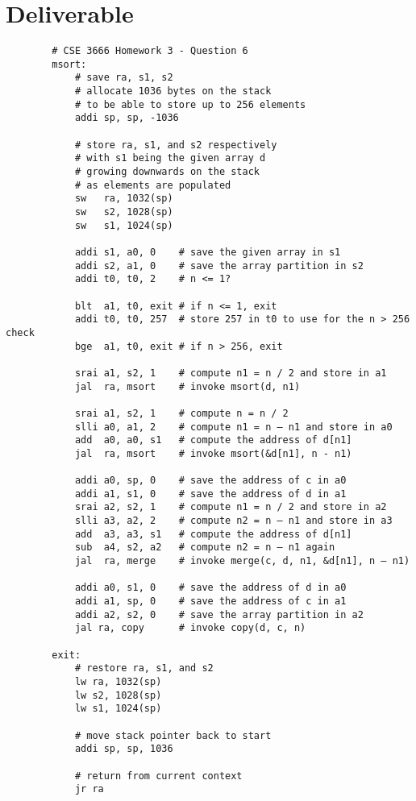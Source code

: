 \documentclass{article}
\begin{document}
\section{Deliverable}
    \begin{lstlisting}
        # CSE 3666 Homework 3 - Question 6
        msort:
            # save ra, s1, s2
            # allocate 1036 bytes on the stack
            # to be able to store up to 256 elements
            addi sp, sp, -1036

            # store ra, s1, and s2 respectively
            # with s1 being the given array d
            # growing downwards on the stack
            # as elements are populated
            sw   ra, 1032(sp)
            sw   s2, 1028(sp)
            sw   s1, 1024(sp) 

            addi s1, a0, 0    # save the given array in s1
            addi s2, a1, 0    # save the array partition in s2
            addi t0, t0, 2    # n <= 1?

            blt  a1, t0, exit # if n <= 1, exit
            addi t0, t0, 257  # store 257 in t0 to use for the n > 256 check
            bge  a1, t0, exit # if n > 256, exit

            srai a1, s2, 1    # compute n1 = n / 2 and store in a1
            jal  ra, msort    # invoke msort(d, n1)

            srai a1, s2, 1    # compute n = n / 2
            slli a0, a1, 2    # compute n1 = n – n1 and store in a0
            add  a0, a0, s1   # compute the address of d[n1]
            jal  ra, msort    # invoke msort(&d[n1], n - n1)
            
            addi a0, sp, 0    # save the address of c in a0
            addi a1, s1, 0    # save the address of d in a1
            srai a2, s2, 1    # compute n1 = n / 2 and store in a2
            slli a3, a2, 2    # compute n2 = n – n1 and store in a3
            add  a3, a3, s1   # compute the address of d[n1]
            sub  a4, s2, a2   # compute n2 = n – n1 again
            jal  ra, merge    # invoke merge(c, d, n1, &d[n1], n – n1)
            
            addi a0, s1, 0    # save the address of d in a0
            addi a1, sp, 0    # save the address of c in a1
            addi a2, s2, 0    # save the array partition in a2
            jal ra, copy      # invoke copy(d, c, n)

        exit:
            # restore ra, s1, and s2
            lw ra, 1032(sp)
            lw s2, 1028(sp)
            lw s1, 1024(sp)

            # move stack pointer back to start
            addi sp, sp, 1036

            # return from current context
            jr ra
    \end{lstlisting}
\end{document}

